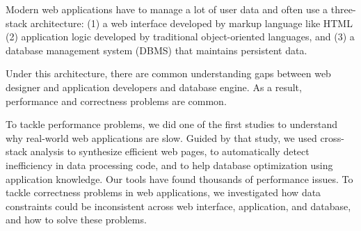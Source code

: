 Modern web applications have to manage a lot of user data and often use a three-stack architecture: (1) a web interface developed by markup language like HTML (2) application logic developed by traditional object-oriented languages, and (3) a database management system (DBMS) that maintains persistent data.
 
Under this architecture, there are common understanding gaps between web designer and application developers and database engine. As a result, performance and correctness problems are common.
 
To tackle performance problems, we did one of the first studies to understand why real-world web applications are slow. Guided by that study, we used cross-stack analysis to synthesize efficient web pages, to automatically detect inefficiency in data processing code, and to help database optimization using application knowledge. Our tools have found thousands of performance issues. To tackle correctness problems in web applications, we investigated how data constraints could be inconsistent across web interface, application, and database, and how to solve these problems.